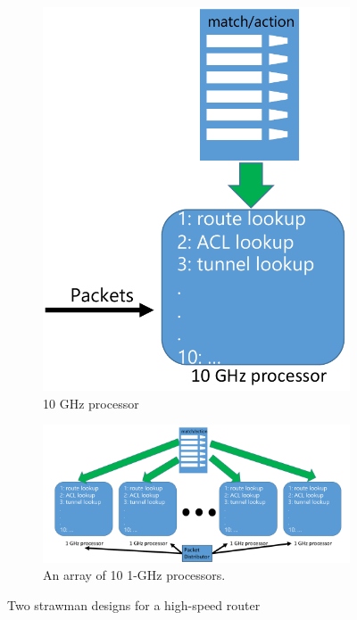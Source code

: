 \begin{figure}[!t]
\begin{subfigure}{0.28\textwidth}
\includegraphics[width=\textwidth]{single_processor.pdf}
\caption{10 GHz processor}
\label{fig:single_processor}
\end{subfigure}
\begin{subfigure}{0.77\textwidth}
\includegraphics[width=\textwidth]{processor_array.pdf}
\caption{An array of 10 1-GHz processors. }
\label{fig:processor_array}
\end{subfigure}
\caption{Two strawman designs for a high-speed router}
\end{figure}

